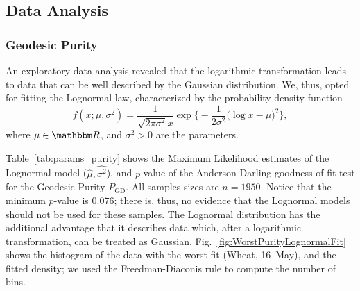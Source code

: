 \documentclass[journal]{IEEEtran}
\begin{document}
\subsection{Data Analysis}

\subsubsection{Geodesic Purity}

An exploratory data analysis revealed that the logarithmic transformation leads to data that can be well described by the Gaussian distribution.
We, thus, opted for fitting the Lognormal law, characterized by the probability density function
\begin{equation}
f(x;\mu,\sigma^2) = \frac{1}{\sqrt{2\pi\sigma^2} x} \exp\Big\{
-\frac1{2 \sigma^2}\big(\log x - \mu\big)^2
\Big\},
\end{equation}
where $\mu\in\mathbbm R$, and $\sigma^2>0$ are the parameters.

Table~\ref{tab:params_purity} shows the Maximum Likelihood estimates of the Lognormal model ($\widehat \mu,\widehat{\sigma^2}$), and $p$-value of the Anderson-Darling goodness-of-fit test for the Geodesic Purity $P_{\text{GD}}$.
All samples sizes are $n=1950$.
Notice that the minimum $p$-value is $0.076$; there is, thus, no evidence that the Lognormal models should not be used for these samples.
The Lognormal distribution has the additional advantage that it describes data which, after a logarithmic transformation, can be treated as Gaussian.
Fig.~\ref{fig:WorstPurityLognormalFit} shows the histogram of the data with the worst fit (Wheat, 16~May), and the fitted density; we used the Freedman-Diaconis rule to compute the number of bins.
\end{document}
